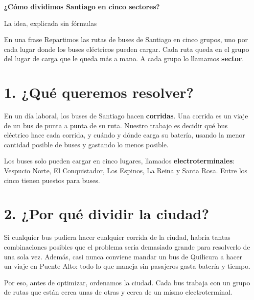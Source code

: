 \documentclass[11pt,a4paper]{article}
\begin{document}
{\LARGE\bfseries\color{azul} ¿Cómo dividimos Santiago en cinco sectores?}\par
\vspace{2pt}
{\large\color{gris} La idea, explicada sin fórmulas}\par
\vspace{6pt}

\begin{caja}{En una frase}
Repartimos las \TotalRutas{} rutas de buses de Santiago en cinco grupos, uno por cada lugar donde
los buses eléctricos pueden cargar. Cada ruta queda en el grupo del lugar de carga que le queda más a mano.
A cada grupo lo llamamos \textbf{sector}.
\end{caja}

\section{1. ¿Qué queremos resolver?}
En un día laboral, los buses de Santiago hacen \TotalCorridas{} \textbf{corridas}. Una corrida es un viaje
de un bus de punta a punta de su ruta. Nuestro trabajo es decidir qué bus eléctrico hace cada corrida, y
cuándo y dónde carga su batería, usando la menor cantidad posible de buses y gastando lo menos posible.

Los buses solo pueden cargar en cinco lugares, llamados \textbf{electroterminales}: Vespucio Norte,
El Conquistador, Los Espinos, La Reina y Santa Rosa. Entre los cinco tienen \TotalPlazas{} puestos para buses.

\section{2. ¿Por qué dividir la ciudad?}
Si cualquier bus pudiera hacer cualquier corrida de la ciudad, habría tantas combinaciones posibles que el
problema sería demasiado grande para resolverlo de una sola vez. Además, casi nunca conviene mandar un bus de
Quilicura a hacer un viaje en Puente Alto: todo lo que maneja sin pasajeros gasta batería y tiempo.

Por eso, antes de optimizar, ordenamos la ciudad. Cada bus trabaja con un grupo de rutas que están cerca
unas de otras y cerca de un mismo electroterminal.
\end{document}
